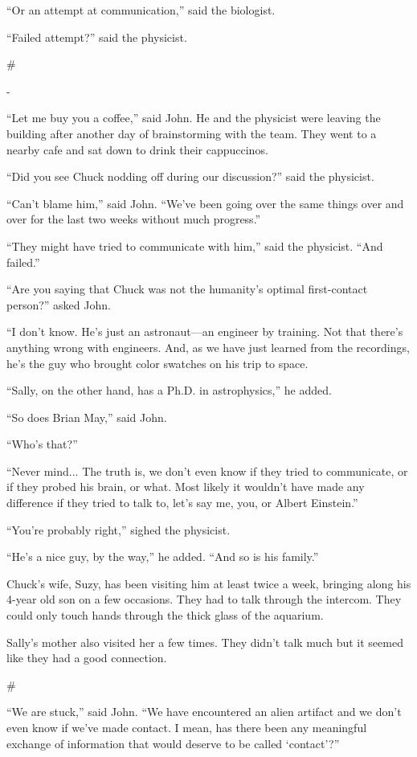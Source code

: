 \documentclass[12pt]{book}
\newcommand{\sbreak}{
\begin{center}
  \#
\end{center}
}
\begin{document}
``Or an attempt at communication,'' said the biologist. 

``Failed attempt?'' said the physicist.

\sbreak-

``Let me buy you a coffee,'' said John. He and the physicist were leaving the building after another day of brainstorming with the team. They went to a nearby cafe and sat down to drink their cappuccinos.

``Did you see Chuck nodding off during our discussion?'' said the physicist.

``Can't blame him,'' said John. ``We've been going over the same things over and over for the last two weeks without much progress.''

``They might have tried to communicate with him,'' said the physicist. ``And failed.''

``Are you saying that Chuck was not the humanity's optimal first-contact person?'' asked John.

``I don't know. He's just an astronaut---an engineer by training. Not that there's anything wrong with engineers. And, as we have just learned from the recordings, he's the guy who brought color swatches on his trip to space.

``Sally, on the other hand, has a Ph.D. in astrophysics,'' he added.

``So does Brian May,'' said John.

``Who's that?''

``Never mind... The truth is, we don't even know if they tried to communicate, or if they probed his brain, or what. Most likely it wouldn't have made any difference if they tried to talk to, let's say me, you, or Albert Einstein.''

``You're probably right,'' sighed the physicist.

``He's a nice guy, by the way,'' he added. ``And so is his family.'' 

Chuck's wife, Suzy, has been visiting him at least twice a week, bringing along his 4-year old son on a few occasions. They had to talk through the intercom. They could only touch hands through the thick glass of the aquarium. 

Sally's mother also visited her a few times. They didn't talk much but it seemed like they had a good connection. 

\sbreak

``We are stuck,'' said John. ``We have encountered an alien artifact and we don't even know if we've made contact. I mean, has there been any meaningful exchange of information that would deserve to be called `contact'?''
\end{document}
